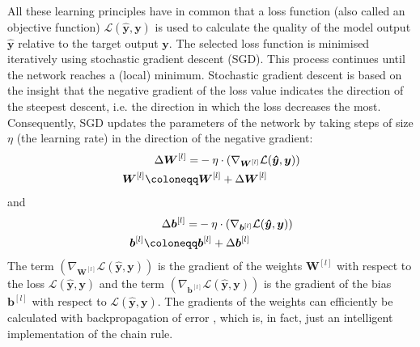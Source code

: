 All these learning principles have in common that a loss function  (also called an objective function) $\mathcal{L}(\boldsymbol{\hat{y}}, \boldsymbol{y})$ is used to calculate the quality of the model output $\boldsymbol{\hat{y}}$ relative to the target output $\boldsymbol{y}$.
The selected loss function is minimised iteratively using stochastic gradient descent (SGD). This process continues until the network reaches a (local) minimum.
Stochastic gradient descent is based on the insight that the negative gradient of the loss value indicates the direction of the steepest descent, i.e. the direction in which the loss decreases the most. Consequently, SGD updates the parameters of the network by taking steps of size $\eta$ (the learning rate) in the direction of the negative gradient:
%
\begin{align}\eqlbl{sgd}
	\begin{aligned}
		\Delta \boldsymbol{W}^{[l]} = & -\eta \cdot \left( \nabla_{\boldsymbol{W}^{[l]}} \mathcal{L}(\boldsymbol{\hat{y}}, \boldsymbol{y}) \right)\\
		\boldsymbol{W}^{[l]} \coloneqq & \boldsymbol{W}^{[l]} + \Delta \boldsymbol{W}^{[l]}
	\end{aligned}
\end{align}
%
and
%	
\begin{align}\eqlbl{sgd2}	
	\begin{aligned}
		\Delta \boldsymbol{b}^{[l]} = & -\eta \cdot \left( \nabla_{\boldsymbol{b}^{[l]}} \mathcal{L}(\boldsymbol{\hat{y}}, \boldsymbol{y}) \right)\\
		\boldsymbol{b}^{[l]} \coloneqq & \boldsymbol{b}^{[l]} + \Delta \boldsymbol{b}^{[l]}
	\end{aligned}
\end{align}
%
The term $\left( \nabla_{\boldsymbol{W}^{[l]}} \mathcal{L}(\boldsymbol{\hat{y}}, \boldsymbol{y}) \right)$ is the gradient of the weights $\boldsymbol{W}^{[l]}$  with respect to the loss $\mathcal{L}(\boldsymbol{\hat{y}}, \boldsymbol{y})$ and the term $\left( \nabla_{\boldsymbol{b}^{[l]}} \mathcal{L}(\boldsymbol{\hat{y}}, \boldsymbol{y}) \right)$ is the gradient of the bias \(\boldsymbol{b}^{[l]}\)  with respect to $\mathcal{L}(\boldsymbol{\hat{y}}, \boldsymbol{y})$.
The gradients of the weights can efficiently be calculated with backpropagation of error , which is, in fact, just an intelligent implementation of the chain rule.

